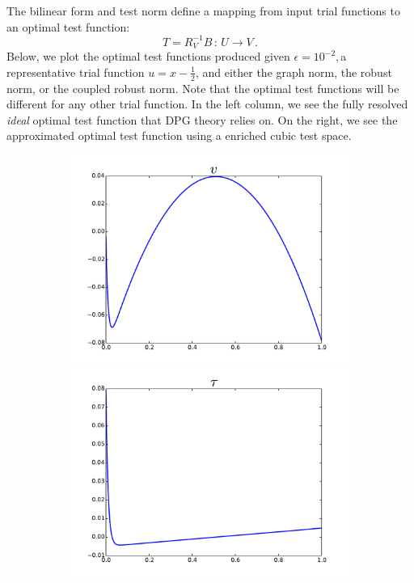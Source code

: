 \documentclass{article}
\theoremstyle{definition}
\theoremstyle{remark}
\begin{document}
The bilinear form and test norm define a mapping from input trial functions to an optimal test function:
\[
T=R_V^{-1}B\,:\,U\rightarrow V\,.
\]
Below, we plot the optimal test functions produced given $\epsilon=10^{-2}, $a representative trial function $u=x-\frac{1}{2}$,
and either the graph norm, the robust norm, or the coupled robust norm.
Note that the optimal test functions will be different for any other trial function.
In the left column, we see the fully resolved \emph{ideal} optimal test function that DPG theory relies on.
On the right, we see the approximated optimal test function using a enriched cubic test space.
\begin{figure}[ht]
\centering
\begin{subfigure}[t]{0.4\textwidth}
\centering
\includegraphics[width=\textwidth]{OptimalTestFunctions/uLinear_1e-2/steady/graph_steady_v}\\
\includegraphics[width=\textwidth]{OptimalTestFunctions/uLinear_1e-2/steady/graph_steady_tau}\\

\end{subfigure}
\end{figure}
\end{document}
